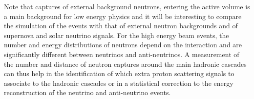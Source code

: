 Note that captures of external background neutrons, entering the active volume is a main background for low energy physics and it will be interesting to compare the simulation of the  events with that of external neutron backgrounds and of supernova and solar neutrino signals. For the high energy beam events, the number and energy distributions of neutrons depend on the interaction and are significantly different between neutrinos and anti-neutrinos. A measurement of the number and distance of neutron captures around the main hadronic cascades can thus help in the identification of which extra proton scattering signals to associate to the hadronic cascades or in a statistical correction to the energy reconstruction of the neutrino and anti-neutrino events.




